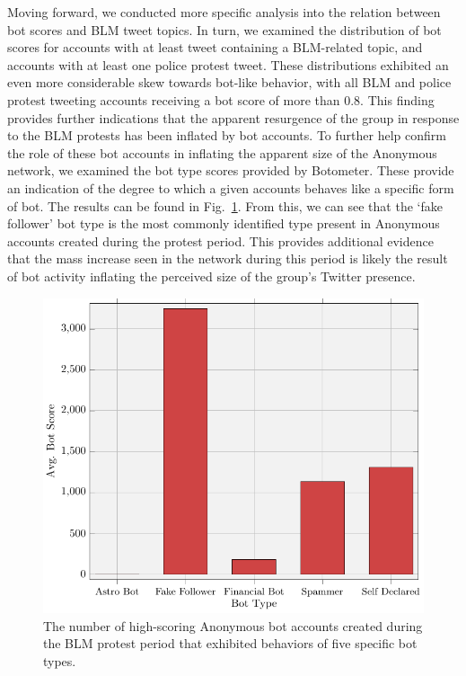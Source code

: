 \documentclass[letterpaper]{article}
\begin{document}
Moving forward, we conducted more specific analysis into the relation between bot scores and BLM tweet topics. In turn, we examined the distribution of bot scores for accounts with at least tweet containing a BLM-related topic, and accounts with at least one police protest tweet. These distributions exhibited an even more considerable skew towards bot-like behavior, with all BLM and police protest tweeting accounts receiving a bot score of more than 0.8. This finding provides further indications that the apparent resurgence of the group in response to the BLM protests has been inflated by bot accounts.  To further help confirm the role of these bot accounts in inflating the apparent size of the Anonymous network, we examined the bot type scores provided by Botometer. These provide an indication of the degree to which a given accounts behaves like a specific form of bot. The results can be found in Fig.~\ref{fig:botTypes}. From this, we can see that the `fake follower' bot type is the most commonly identified type present in Anonymous accounts created during the protest period. This provides additional evidence that the mass increase seen in the network during this period is likely the result of bot activity inflating the perceived size of the group's Twitter presence.

\begin{figure}[!ht]
\centering
\includegraphics[width=0.6\linewidth]{bot_types.pdf}
\caption{The number of high-scoring Anonymous bot accounts created during the BLM protest period that exhibited behaviors of five specific bot types.}
\label{fig:botTypes}
\end{figure}
\end{document}
